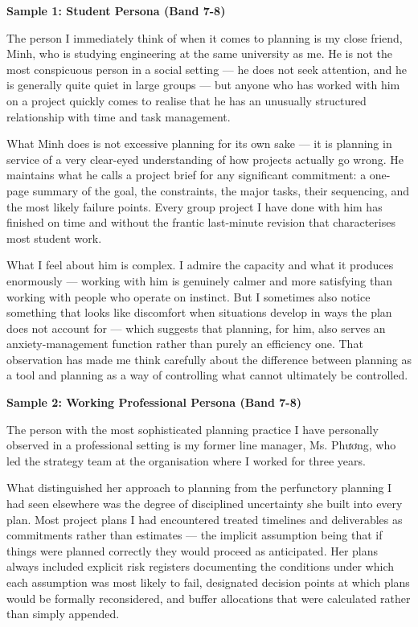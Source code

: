 \begin{ieltsanswer}
\textbf{Sample 1: Student Persona (Band 7-8)}

The person I immediately think of when it comes to planning is my close friend, Minh, who is studying engineering at the same university as me. He is not the most conspicuous person in a social setting — he does not seek attention, and he is generally quite quiet in large groups — but anyone who has worked with him on a project quickly comes to realise that he has an unusually structured relationship with time and task management.

What Minh does is not excessive planning for its own sake — it is planning in service of a very clear-eyed understanding of how projects actually go wrong. He maintains what he calls a project brief for any significant commitment: a one-page summary of the goal, the constraints, the major tasks, their sequencing, and the most likely failure points. Every group project I have done with him has finished on time and without the frantic last-minute revision that characterises most student work.

What I feel about him is complex. I admire the capacity and what it produces enormously — working with him is genuinely calmer and more satisfying than working with people who operate on instinct. But I sometimes also notice something that looks like discomfort when situations develop in ways the plan does not account for — which suggests that planning, for him, also serves an anxiety-management function rather than purely an efficiency one. That observation has made me think carefully about the difference between planning as a tool and planning as a way of controlling what cannot ultimately be controlled.

\textbf{Sample 2: Working Professional Persona (Band 7-8)}

The person with the most sophisticated planning practice I have personally observed in a professional setting is my former line manager, Ms. Phương, who led the strategy team at the organisation where I worked for three years.

What distinguished her approach to planning from the perfunctory planning I had seen elsewhere was the degree of disciplined uncertainty she built into every plan. Most project plans I had encountered treated timelines and deliverables as commitments rather than estimates — the implicit assumption being that if things were planned correctly they would proceed as anticipated. Her plans always included explicit risk registers documenting the conditions under which each assumption was most likely to fail, designated decision points at which plans would be formally reconsidered, and buffer allocations that were calculated rather than simply appended.


\end{ieltsanswer}
